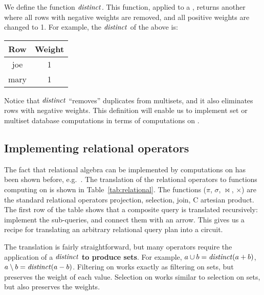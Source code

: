 
We define the function $\mathit{distinct}$.  This function, applied to a \zr,
returns another \zr where all rows with negative weights are removed,
and all positive weights are changed to 1.  For example, the
$\mathit{distinct}$ of the above \zr is:
%
\begin{center}
\begin{tabular}{|c|c|}\hline
  Row & Weight \\ \hline
  joe & 1 \\
  mary & 1 \\ \hline
\end{tabular}
\end{center}

Notice that $\mathit{distinct}$ ``removes'' duplicates from multisets, and it also eliminates
rows with negative weights.
This definition will enable us to implement set or multiset database
computations in terms of computations on \zrs.

\subsection{Implementing relational operators}\label{sec:relational-operators}

The fact that relational algebra can be implemented by computations on
\zrs has been shown before, e.g.~\cite{green-pods07}.  The translation
of the relational operators to functions computing on \zrs is shown in
Table~\ref{tab:relational}.  The functions ($\pi$, $\sigma$,
$\bowtie$, $\times$) are the standard relational operators projection,
selection, join, C artesian product.  The first row of the table shows
that a composite query is translated recursively: implement the
sub-queries, and connect them with an arrow.  This gives us a recipe
for translating an arbitrary relational query plan into a circuit.

The translation is fairly straightforward, but many operators require
the application of a $\mathit{distinct}$ \textbf{to produce sets}.  For
example, $a \cup b = \mathit{distinct}(a + b)$, $a \setminus b = \mathit{distinct}(a -
b)$.  Filtering on \zrs works exactly as filtering on sets, but
preserves the weight of each value.  Selection on \zrs works similar
to selection on sets, but also preserves the weights.

